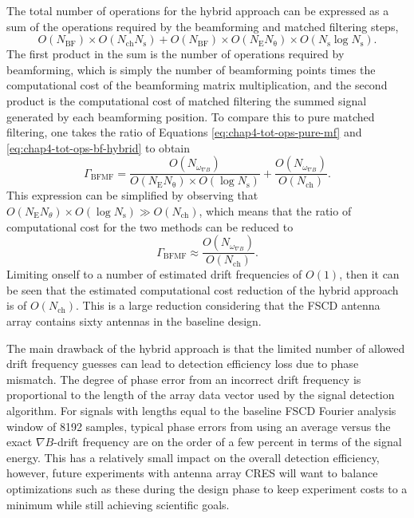 The total number of operations for the hybrid approach can be expressed as a sum of the operations required by the beamforming and matched filtering steps,
\begin{equation}
    O(N_\mathrm{BF})\times O(N_\mathrm{ch}N_\mathrm{s}) + O(N_\mathrm{BF})\times O(N_\mathrm{E}N_\mathrm{\theta})\times O(N_\mathrm{s}\log{N_\mathrm{s}}).
    \label{eq:chap4-tot-ops-bf-hybrid}
\end{equation}
The first product in the sum is the number of operations required by beamforming, which is simply the number of beamforming points times the computational cost of the beamforming matrix multiplication, and the second product is the computational cost of matched filtering the summed signal generated by each beamforming position. To compare this to pure matched filtering, one takes the ratio of Equations \ref{eq:chap4-tot-ops-pure-mf} and \ref{eq:chap4-tot-ops-bf-hybrid} to obtain 
\begin{equation}
    \Gamma_\mathrm{BFMF}=\frac{O(N_{\omega_{\nabla B}})}{O(N_\mathrm{E}N_\mathrm{\theta})\times O(\log{N_\mathrm{s}})} + \frac{O(N_{\omega_{\nabla B}})}{O(N_\mathrm{ch})}.
\end{equation}
This expression can be simplified by observing that $O(N_\mathrm{E}N_\theta)\times O(\log{N_\mathrm{s}})\gg O(N_\mathrm{ch})$, which means that the ratio of computational cost for the two methods can be reduced to
\begin{equation}
    \Gamma_\mathrm{BFMF}\approx \frac{O(N_{\omega_{\nabla B}})}{O(N_\mathrm{ch})}.
\end{equation} 
Limiting onself to a number of estimated drift frequencies of $O(1)$, then it can be seen that the estimated computational cost reduction of the hybrid approach is of $O(N_\mathrm{ch})$. This is a large reduction considering that the FSCD antenna array contains sixty antennas in the baseline design. 

The main drawback of the hybrid approach is that the limited number of allowed drift frequency guesses can lead to detection efficiency loss due to phase mismatch. The degree of phase error from an incorrect drift frequency is proportional to the length of the array data vector used by the signal detection algorithm. For signals with lengths equal to the baseline FSCD Fourier analysis window of 8192 samples, typical phase errors from using an average versus the exact $\nabla B$-drift frequency are on the order of a few percent in terms of the signal energy. This has a relatively small impact on the overall detection efficiency, however, future experiments with antenna array CRES will want to balance optimizations such as these during the design phase to keep experiment costs to a minimum while still achieving scientific goals.

